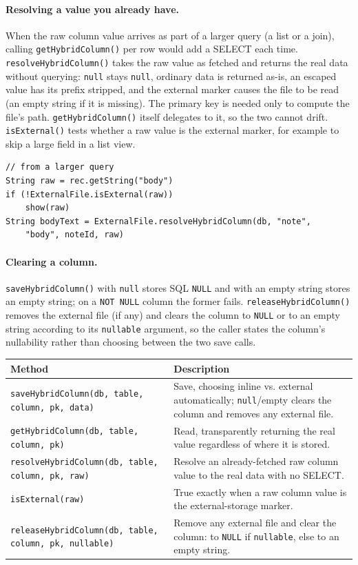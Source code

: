 \paragraph{Resolving a value you already have.} When the raw column value arrives as part of a larger query (a list or a join), calling \texttt{getHybridColumn()} per row would add a SELECT each time. \texttt{resolveHybridColumn()} takes the raw value as fetched and returns the real data without querying: \texttt{null} stays \texttt{null}, ordinary data is returned as-is, an escaped value has its prefix stripped, and the external marker causes the file to be read (an empty string if it is missing). The primary key is needed only to compute the file's path. \texttt{getHybridColumn()} itself delegates to it, so the two cannot drift. \texttt{isExternal()} tests whether a raw value is the external marker, for example to skip a large field in a list view.

\begin{lstlisting}[style=groovy]
// from a larger query
String raw = rec.getString("body")
if (!ExternalFile.isExternal(raw))
    show(raw)
String bodyText = ExternalFile.resolveHybridColumn(db, "note",
    "body", noteId, raw)
\end{lstlisting}

\paragraph{Clearing a column.} \texttt{saveHybridColumn()} with \texttt{null} stores SQL \texttt{NULL} and with an empty string stores an empty string; on a \texttt{NOT NULL} column the former fails. \texttt{releaseHybridColumn()} removes the external file (if any) and clears the column to \texttt{NULL} or to an empty string according to its \texttt{nullable} argument, so the caller states the column's nullability rather than choosing between the two save calls.

\begin{longtable}{P{5.2cm}P{5.3cm}}
\toprule
\textbf{Method} & \textbf{Description} \\
\midrule
\endhead
\texttt{saveHybridColumn(db, table, column, pk, data)} & Save, choosing inline vs. external automatically; \texttt{null}/empty clears the column and removes any external file. \\
\texttt{getHybridColumn(db, table, column, pk)} & Read, transparently returning the real value regardless of where it is stored. \\
\texttt{resolveHybridColumn(db, table, column, pk, raw)} & Resolve an already-fetched raw column value to the real data with no SELECT. \\
\texttt{isExternal(raw)} & True exactly when a raw column value is the external-storage marker. \\
\texttt{releaseHybridColumn(db, table, column, pk, nullable)} & Remove any external file and clear the column: to \texttt{NULL} if \texttt{nullable}, else to an empty string. \\
\bottomrule
\end{longtable}

